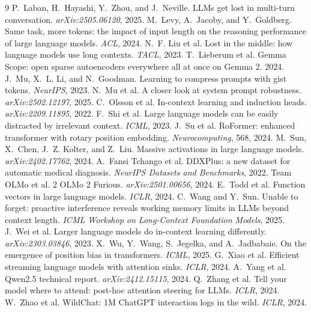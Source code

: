 \documentclass{article}
\begin{document}
\begin{thebibliography}{9}
 P.~Laban, H.~Hayashi, Y.~Zhou, and J.~Neville. LLMs get lost in multi-turn conversation. \emph{arXiv:2505.06120}, 2025.
 M.~Levy, A.~Jacoby, and Y.~Goldberg. Same task, more tokens: the impact of input length on the reasoning performance of large language models. \emph{ACL}, 2024.
 N.~F. Liu et al. Lost in the middle: how language models use long contexts. \emph{TACL}, 2023.
 T.~Lieberum et al. Gemma Scope: open sparse autoencoders everywhere all at once on Gemma 2. 2024.
 J.~Mu, X.~L. Li, and N.~Goodman. Learning to compress prompts with gist tokens. \emph{NeurIPS}, 2023.
 N.~Mu et al. A closer look at system prompt robustness. \emph{arXiv:2502.12197}, 2025.
 C.~Olsson et al. In-context learning and induction heads. \emph{arXiv:2209.11895}, 2022.
 F.~Shi et al. Large language models can be easily distracted by irrelevant context. \emph{ICML}, 2023.
 J.~Su et al. RoFormer: enhanced transformer with rotary position embedding. \emph{Neurocomputing}, 568, 2024.
 M.~Sun, X.~Chen, J.~Z. Kolter, and Z.~Liu. Massive activations in large language models. \emph{arXiv:2402.17762}, 2024.
 A.~Fansi Tchango et al. DDXPlus: a new dataset for automatic medical diagnosis. \emph{NeurIPS Datasets and Benchmarks}, 2022.
 Team OLMo et al. 2 OLMo 2 Furious. \emph{arXiv:2501.00656}, 2024.
 E.~Todd et al. Function vectors in large language models. \emph{ICLR}, 2024.
 C.~Wang and Y.~Sun. Unable to forget: proactive interference reveals working memory limits in LLMs beyond context length. \emph{ICML Workshop on Long-Context Foundation Models}, 2025.
 J.~Wei et al. Larger language models do in-context learning differently. \emph{arXiv:2303.03846}, 2023.
 X.~Wu, Y.~Wang, S.~Jegelka, and A.~Jadbabaie. On the emergence of position bias in transformers. \emph{ICML}, 2025.
 G.~Xiao et al. Efficient streaming language models with attention sinks. \emph{ICLR}, 2024.
 A.~Yang et al. Qwen2.5 technical report. \emph{arXiv:2412.15115}, 2024.
 Q.~Zhang et al. Tell your model where to attend: post-hoc attention steering for LLMs. \emph{ICLR}, 2024.
 W.~Zhao et al. WildChat: 1M ChatGPT interaction logs in the wild. \emph{ICLR}, 2024.
\end{thebibliography}
\end{document}
